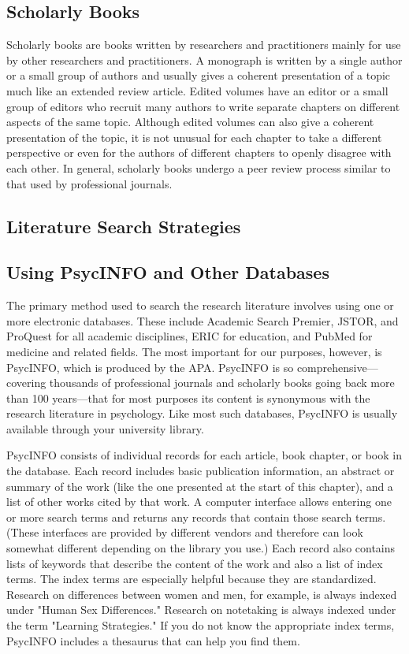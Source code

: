 \subsection{Scholarly Books}
Scholarly books are books written by researchers and practitioners mainly for use by other researchers and practitioners. A monograph is written by a single author or a small group of authors and usually gives a coherent presentation of a topic much like an extended review article. Edited volumes have an editor or a small group of editors who recruit many authors to write separate chapters on different aspects of the same topic. Although edited volumes can also give a coherent presentation of the topic, it is not unusual for each chapter to take a different perspective or even for the authors of different chapters to openly disagree with each other. In general, scholarly books undergo a peer review process similar to that used by professional journals.

\subsection{Literature Search Strategies}
\subsection{Using PsycINFO and Other Databases}
The primary method used to search the research literature involves using one or more electronic databases. These include Academic Search Premier, JSTOR, and ProQuest for all academic disciplines, ERIC for education, and PubMed for medicine and related fields. The most important for our purposes, however, is PsycINFO, which is produced by the APA. PsycINFO is so comprehensive---covering thousands of professional journals and scholarly books going back more than 100 years---that for most purposes its content is synonymous with the research literature in psychology. Like most such databases, PsycINFO is usually available through your university library. 


PsycINFO consists of individual records for each article, book chapter, or book in the database. Each record includes basic publication information, an abstract or summary of the work (like the one presented at the start of this chapter), and a list of other works cited by that work. A computer interface allows entering one or more search terms and returns any records that contain those search terms. (These interfaces are provided by different vendors and therefore can look somewhat different depending on the library you use.) Each record also contains lists of keywords that describe the content of the work and also a list of index terms. The index terms are especially helpful because they are standardized. Research on differences between women and men, for example, is always indexed under "Human Sex Differences." Research on notetaking is always indexed under the term "Learning Strategies." If you do not know the appropriate index terms, PsycINFO includes a thesaurus that can help you find them.

